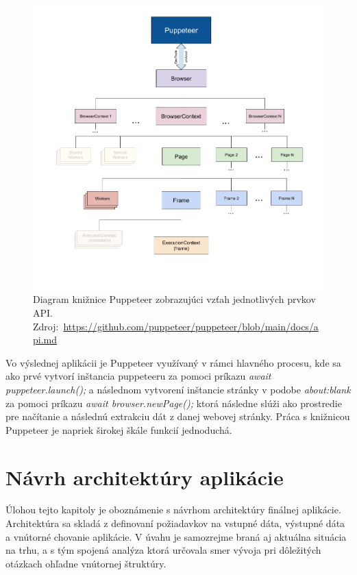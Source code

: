 \begin{figure}[hbt]
	\centering
	\includegraphics[width=1\textwidth]{obrazky-figures/diagram.png}
	\caption{Diagram knižnice Puppeteer zobrazujúci vzťah jednotlivých prvkov API. \mbox{Zdroj: \url{https://github.com/puppeteer/puppeteer/blob/main/docs/api.md}}}
	\label{diagram}
\end{figure}

Vo výslednej aplikácii je Puppeteer využívaný v rámci hlavného procesu, kde sa ako prvé vytvorí inštancia puppeteeru za pomoci príkazu \textit{await puppeteer.launch();} a následnom vytvorení inštancie stránky v podobe \textit{about:blank} za pomoci príkazu \textit{await browser.newPage();} ktorá následne slúži ako prostredie pre načítanie a následnú extrakciu dát z danej webovej stránky. Práca s knižnicou Puppeteer je napriek širokej škále funkcií jednoduchá.

\chapter{Návrh architektúry aplikácie}
\label{Navrh}
Úlohou tejto kapitoly je oboznámenie s návrhom architektúry finálnej aplikácie. Architektúra sa skladá z definovaní požiadavkov na vstupné dáta, výstupné dáta a vnútorné chovanie aplikácie. V úvahu je samozrejme braná aj aktuálna situácia na trhu, a s tým spojená analýza ktorá určovala smer vývoja pri dôležitých otázkach ohľadne vnútornej štruktúry.

